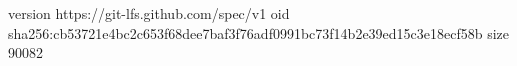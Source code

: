 version https://git-lfs.github.com/spec/v1
oid sha256:cb53721e4bc2c653f68dee7baf3f76adf0991bc73f14b2e39ed15c3e18ecf58b
size 90082
